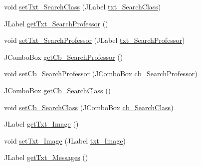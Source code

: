 \begin{DoxyCompactItemize}
\item 
void \mbox{\hyperlink{classcom_1_1_b_n_u_1_1pages_1_1main_1_1_main_model_ab06f458998c71b909350476a2da6f428}{set\+Txt\+\_\+\+Search\+Class}} (J\+Label \mbox{\hyperlink{classcom_1_1_b_n_u_1_1pages_1_1main_1_1_main_model_a05f13f06052fa12105395030f010fa48}{txt\+\_\+\+Search\+Class}})
\item 
J\+Label \mbox{\hyperlink{classcom_1_1_b_n_u_1_1pages_1_1main_1_1_main_model_a0aca6ae5ed0cf2e83a5d7940ef1c0488}{get\+Txt\+\_\+\+Search\+Professor}} ()
\item 
void \mbox{\hyperlink{classcom_1_1_b_n_u_1_1pages_1_1main_1_1_main_model_ae5210ce753cebdc4da9516b0e285d72c}{set\+Txt\+\_\+\+Search\+Professor}} (J\+Label \mbox{\hyperlink{classcom_1_1_b_n_u_1_1pages_1_1main_1_1_main_model_a6560d740e27ddcf5d51c3ba543900e09}{txt\+\_\+\+Search\+Professor}})
\item 
J\+Combo\+Box \mbox{\hyperlink{classcom_1_1_b_n_u_1_1pages_1_1main_1_1_main_model_a09cc459b6d0402952472fcbd9f23416f}{get\+Cb\+\_\+\+Search\+Professor}} ()
\item 
void \mbox{\hyperlink{classcom_1_1_b_n_u_1_1pages_1_1main_1_1_main_model_a41ea3eed7fb233911a620b6f133ed4b7}{set\+Cb\+\_\+\+Search\+Professor}} (J\+Combo\+Box \mbox{\hyperlink{classcom_1_1_b_n_u_1_1pages_1_1main_1_1_main_model_a251d38b91ccc0e8e80942454b3431afd}{cb\+\_\+\+Search\+Professor}})
\item 
J\+Combo\+Box \mbox{\hyperlink{classcom_1_1_b_n_u_1_1pages_1_1main_1_1_main_model_a959a9cc11f35ac773d7144450d1f1b6d}{get\+Cb\+\_\+\+Search\+Class}} ()
\item 
void \mbox{\hyperlink{classcom_1_1_b_n_u_1_1pages_1_1main_1_1_main_model_aa52d3b7c01320c7b9b0a51874aa9eb8e}{set\+Cb\+\_\+\+Search\+Class}} (J\+Combo\+Box \mbox{\hyperlink{classcom_1_1_b_n_u_1_1pages_1_1main_1_1_main_model_a0a5b18be10fe22b2ea92e6914a66042f}{cb\+\_\+\+Search\+Class}})
\item 
J\+Label \mbox{\hyperlink{classcom_1_1_b_n_u_1_1pages_1_1main_1_1_main_model_afb671fbf56404c855de4b15a2957be74}{get\+Txt\+\_\+\+Image}} ()
\item 
void \mbox{\hyperlink{classcom_1_1_b_n_u_1_1pages_1_1main_1_1_main_model_a4fde6515a18561ec8e5962dca6732484}{set\+Txt\+\_\+\+Image}} (J\+Label \mbox{\hyperlink{classcom_1_1_b_n_u_1_1pages_1_1main_1_1_main_model_ac16a51431b0a713186eafae4c5e4477a}{txt\+\_\+\+Image}})
\item 
J\+Label \mbox{\hyperlink{classcom_1_1_b_n_u_1_1pages_1_1main_1_1_main_model_a1a9ea86bb86727a3b76b38d95baa7f34}{get\+Txt\+\_\+\+Messages}} ()

\end{DoxyCompactItemize}
